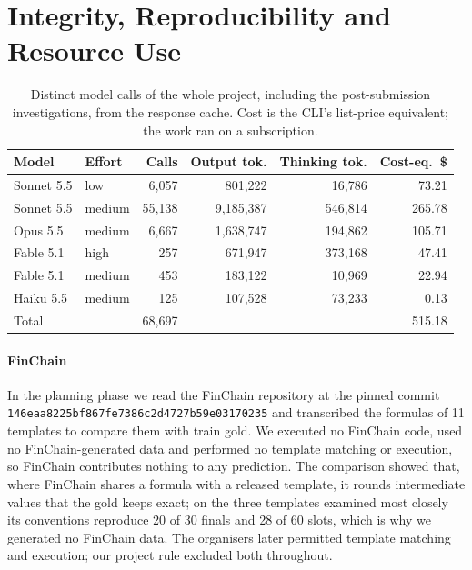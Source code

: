 \documentclass[conference]{IEEEtran}
\newcommand{\id}[1]{\texttt{#1}}
\begin{document}
\section{Integrity, Reproducibility and Resource Use}\label{sec:integrity}
\begin{table}[t]
\caption{Distinct model calls of the whole project, including the post-submission investigations, from the response cache. Cost is the CLI's list-price equivalent; the work ran on a subscription.}
\label{tab:usage}
\centering
\scriptsize
\begin{tabular}{@{}llrrrr@{}}
\toprule
Model & Effort & Calls & Output tok. & Thinking tok. & Cost-eq.\ \$ \\
\midrule
Sonnet 5.5 & low & 6,057 & 801,222 & 16,786 & 73.21 \\
Sonnet 5.5 & medium & 55,138 & 9,185,387 & 546,814 & 265.78 \\
Opus 5.5 & medium & 6,667 & 1,638,747 & 194,862 & 105.71 \\
Fable 5.1 & high & 257 & 671,947 & 373,168 & 47.41 \\
Fable 5.1 & medium & 453 & 183,122 & 10,969 & 22.94 \\
Haiku 5.5 & medium & 125 & 107,528 & 73,233 & 0.13 \\
\midrule
Total & & 68,697 & & & 515.18 \\
\bottomrule
\end{tabular}
\end{table}

\paragraph*{FinChain}
In the planning phase we read the FinChain repository at the pinned commit \id{146eaa8225bf867fe7386c2d4727b59e03170235} and transcribed the formulas of 11 templates to compare them with train gold. We executed no FinChain code, used no FinChain-generated data and performed no template matching or execution, so FinChain contributes nothing to any prediction. The comparison showed that, where FinChain shares a formula with a released template, it rounds intermediate values that the gold keeps exact; on the three templates examined most closely its conventions reproduce 20 of 30 finals and 28 of 60 slots, which is why we generated no FinChain data. The organisers later permitted template matching and execution; our project rule excluded both throughout.
\end{document}
